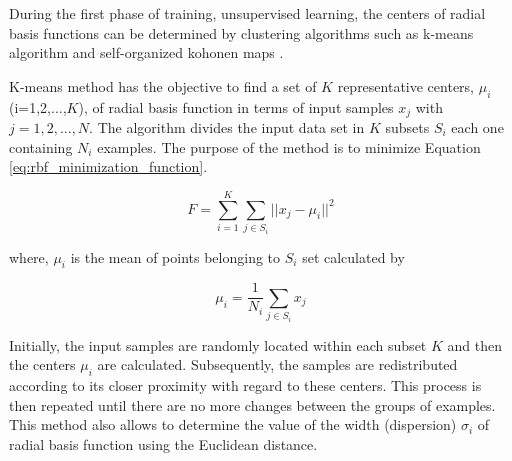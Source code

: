 During the first phase of training, unsupervised learning, the centers of radial basis functions can be determined by clustering algorithms such as k-means algorithm \cite{musavi1992training} and self-organized kohonen maps \cite{valenca1995fundamentos}.

K-means method has the objective to find a set of $K$ representative centers, $\mu_i$ (i=1,2,...,$K$), of radial basis function in terms of input samples $x_j$ with $j=1,2,...,N$. The algorithm divides the input data set in $K$ subsets $S_i$ each one containing $N_i$ examples. The purpose of the method is to minimize Equation \ref{eq:rbf_minimization_function}.

\begin{equation}
\label{eq:rbf_minimization_function}
F = \sum_{i=1}^{K} \sum_{j \in S_i} || x_j-\mu_i ||^2
\end{equation}

where, $\mu_i$ is the mean of points belonging to $S_i$ set calculated by

\begin{equation}
\label{eq:rbf_mi_i}
\mu_i = \frac{1}{N_i} \sum_{j \in S_i} x_j
\end{equation}

Initially, the input samples are randomly located within each subset $K$ and then the centers $\mu_i$ are calculated. Subsequently, the samples are redistributed according to its closer proximity with regard to these centers. This process is then repeated until there are no more changes between the groups of examples. This method also allows to determine the value of the width (dispersion) $\sigma_i$ of radial basis function using the Euclidean distance.

